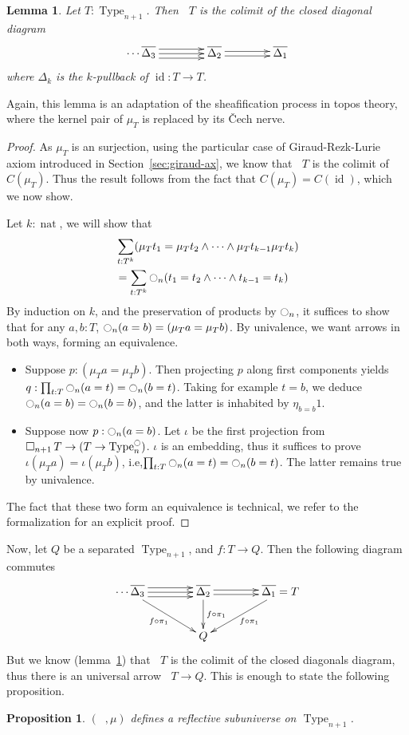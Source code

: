 \documentclass[conference]{IEEEtran}
\makeatletter
\newtheorem{prop}[thm]{Proposition}
\newtheorem{lem}[thm]{Lemma}
\newcommand{\ie}{i.e,\xspace}
\def\dar[#1]#2{\ar@<-#2>[#1]\ar@<#2>[#1]} %
\def\tar[#1]#2{\ar@<#2>[#1]\ar@<0pt>[#1]\ar@<-#2>[#1]} %
\DeclareMathOperator{\Type}{Type}
\DeclareMathOperator{\nat}{nat}
\DeclareMathOperator{\id}{id}
\newcommand{\modal}{\ensuremath{\ocircle}}
\newcommand \separated {\mathop{\square_{n+1}} }
\makeatother
\begin{document}
\begin{lem}\label{lem:sepiscolim}
  Let $T:\Type_{n+1}$. Then $\separated T$ is the colimit of the closed
  diagonal diagram
  $$\xymatrix @C=4em  { 
    \cdots \overline{\Delta_3} \tar[r]{4pt} & \overline{\Delta_2} \dar[r]{2pt} &
    \overline{\Delta_1}
  }$$
where $\Delta_k$ is the $k$-pullback of $\id : T \to T$.
\end{lem}

Again, this lemma is an adaptation of the sheafification process in
topos theory, where the kernel pair of $\mu_T$
is replaced by its \v{C}ech nerve.

\begin{proof}
  As $\mu_T$ is an surjection, using the particular case of 
  Giraud-Rezk-Lurie axiom introduced in Section~\ref{sec:giraud-ax},
  we know that $\separated T$ is the colimit of $C(\mu_T)$. 
%
  Thus the result follows from the fact that $C(\mu_T) = C(\id)$,
  which we now show.

  Let $k:\nat$, we will show that 
  \begin{align*}
    &\sum_{t:T^k} (\mu_T t_1 = \mu_T t_2 \land \cdots
      \land \mu_T t_{k-1} \mu_T t_k)\\
    &= \sum_{t:T^k} \modal_n (t_1 = t_2 \land \cdots
      \land t_{k-1} = t_k)
  \end{align*}
By induction on $k$, and the preservation of products by $\modal_n$, it
suffices to show that for any $a,b:T$, $\modal_n (a=b) = (\mu_T a =
\mu_T b)$. By univalence, we want arrows in both ways, forming an
equivalence.
\begin{itemize}
\item Suppose $p : (\mu_T a = \mu_T b)$. Then projecting $p$ along
  first components yields $q : \prod_{t:T} \modal_n(a=t) = \modal_n (b=t)
  $.
  Taking for example $t=b$, we deduce $\modal_n (a=b) = \modal_n(b=b)$,
  and the latter is inhabited by $\eta_{b=b} 1$.
\item Suppose now $p : \modal_n(a=b)$. Let $\iota$ be the first
  projection from $\separated T \to (T \to \Type_n^\modal)$. $\iota$ is
  an embedding, thus it suffices to prove $\iota (\mu_T a) = \iota
  (\mu_T b)$, \ie $\prod_{t:T}\modal_n (a=t) = \modal_n (b=t)$. The latter
  remains true by univalence.
\end{itemize}
The fact that these two form an equivalence is technical, we refer to
the formalization for an explicit proof.
\end{proof}

Now, let $Q$ be a separated $\Type_{n+1}$, and $f:T \to Q$. Then the
following diagram commutes
$$\xymatrix @C=4em{ 
    \cdots \overline{\Delta_3} \tar[r]{4pt} \ar[rd]_{f\circ \pi_1} & \overline{\Delta_2}
    \dar[r]{2pt} \ar[d]^{f\circ \pi_1} &
    \overline{\Delta_1} = T \ar[ld]^{f\circ \pi_1}\\
    & Q &
  }$$
But we know (lemma~\ref{lem:sepiscolim}) that $\separated T$ is the
colimit of the closed diagonals diagram, thus there is an universal
arrow $\separated T \to Q$.
%
This is enough to state the following proposition.
\begin{prop}\label{prop:sep-subu}
  $(\separated,\mu)$ defines a reflective subuniverse on $\Type_{n+1}$.
\end{prop}
\end{document}
